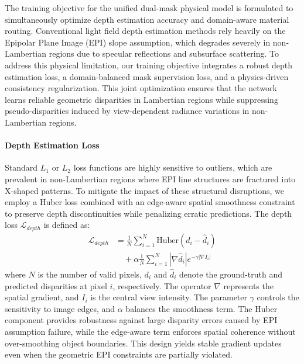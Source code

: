 \documentclass[lettersize,journal]{IEEEtran}
\begin{document}
The training objective for the unified dual-mask physical model is formulated to simultaneously optimize depth estimation accuracy and domain-aware material routing. Conventional light field depth estimation methods rely heavily on the Epipolar Plane Image (EPI) slope assumption, which degrades severely in non-Lambertian regions due to specular reflections and subsurface scattering. To address this physical limitation, our training objective integrates a robust depth estimation loss, a domain-balanced mask supervision loss, and a physics-driven consistency regularization. This joint optimization ensures that the network learns reliable geometric disparities in Lambertian regions while suppressing pseudo-disparities induced by view-dependent radiance variations in non-Lambertian regions.

\paragraph{Depth Estimation Loss}

Standard $L_1$ or $L_2$ loss functions are highly sensitive to outliers, which are prevalent in non-Lambertian regions where EPI line structures are fractured into X-shaped patterns. To mitigate the impact of these structural disruptions, we employ a Huber loss combined with an edge-aware spatial smoothness constraint to preserve depth discontinuities while penalizing erratic predictions. The depth loss $\mathcal{L}_{depth}$ is defined as:
\begin{equation}
\begin{aligned}
\mathcal{L}_{depth} &= \frac{1}{N} \sum_{i=1}^{N} \text{Huber}(d_i - \hat{d}_i) \\
&\quad + \alpha \frac{1}{N} \sum_{i=1}^{N} |\nabla \hat{d}_i| e^{-\gamma |\nabla I_i|}
\end{aligned}
\end{equation}
where $N$ is the number of valid pixels, $d_i$ and $\hat{d}_i$ denote the ground-truth and predicted disparities at pixel $i$, respectively. The operator $\nabla$ represents the spatial gradient, and $I_i$ is the central view intensity. The parameter $\gamma$ controls the sensitivity to image edges, and $\alpha$ balances the smoothness term. The Huber component provides robustness against large disparity errors caused by EPI assumption failure, while the edge-aware term enforces spatial coherence without over-smoothing object boundaries. This design yields stable gradient updates even when the geometric EPI constraints are partially violated.
\end{document}
